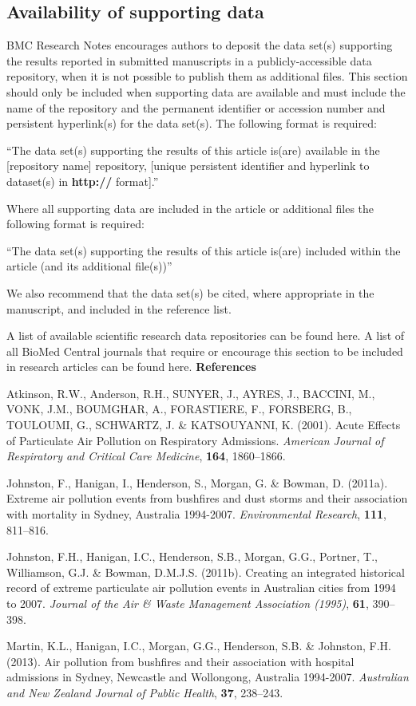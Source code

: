 \subsection{Availability of supporting
data}\label{availability-of-supporting-data}

BMC Research Notes encourages authors to deposit the data set(s)
supporting the results reported in submitted manuscripts in a
publicly-accessible data repository, when it is not possible to publish
them as additional files. This section should only be included when
supporting data are available and must include the name of the
repository and the permanent identifier or accession number and
persistent hyperlink(s) for the data set(s). The following format is
required:

``The data set(s) supporting the results of this article is(are)
available in the {[}repository name{]} repository, {[}unique persistent
identifier and hyperlink to dataset(s) in \textbf{http://} format{]}.''

Where all supporting data are included in the article or additional
files the following format is required:

``The data set(s) supporting the results of this article is(are)
included within the article (and its additional file(s))''

We also recommend that the data set(s) be cited, where appropriate in
the manuscript, and included in the reference list.

A list of available scientific research data repositories can be found
here. A list of all BioMed Central journals that require or encourage
this section to be included in research articles can be found here.
\textbf{References}

Atkinson, R.W., Anderson, R.H., SUNYER, J., AYRES, J., BACCINI, M.,
VONK, J.M., BOUMGHAR, A., FORASTIERE, F., FORSBERG, B., TOULOUMI, G.,
SCHWARTZ, J. \& KATSOUYANNI, K. (2001). Acute Effects of Particulate Air
Pollution on Respiratory Admissions. \emph{American Journal of
Respiratory and Critical Care Medicine}, \textbf{164}, 1860--1866.

Johnston, F., Hanigan, I., Henderson, S., Morgan, G. \& Bowman, D.
(2011a). Extreme air pollution events from bushfires and dust storms and
their association with mortality in Sydney, Australia 1994-2007.
\emph{Environmental Research}, \textbf{111}, 811--816.

Johnston, F.H., Hanigan, I.C., Henderson, S.B., Morgan, G.G., Portner,
T., Williamson, G.J. \& Bowman, D.M.J.S. (2011b). Creating an integrated
historical record of extreme particulate air pollution events in
Australian cities from 1994 to 2007. \emph{Journal of the Air \& Waste
Management Association (1995)}, \textbf{61}, 390--398.

Martin, K.L., Hanigan, I.C., Morgan, G.G., Henderson, S.B. \& Johnston,
F.H. (2013). Air pollution from bushfires and their association with
hospital admissions in Sydney, Newcastle and Wollongong, Australia
1994-2007. \emph{Australian and New Zealand Journal of Public Health},
\textbf{37}, 238--243.

